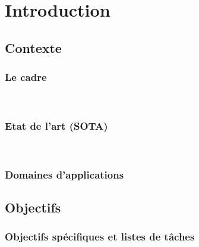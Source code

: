 \section{Introduction}
\subsection{Contexte}

\subsubsection{\large Le cadre}
~\cite{Polycop-Ondes}

\subsubsection{\large Etat de l'art (SOTA)}
~\cite{wikipedia-onde}


\subsubsection{\large Domaines d'applications}

\subsection{Objectifs}

\subsubsection{\large Objectifs spécifiques et listes de tâches}